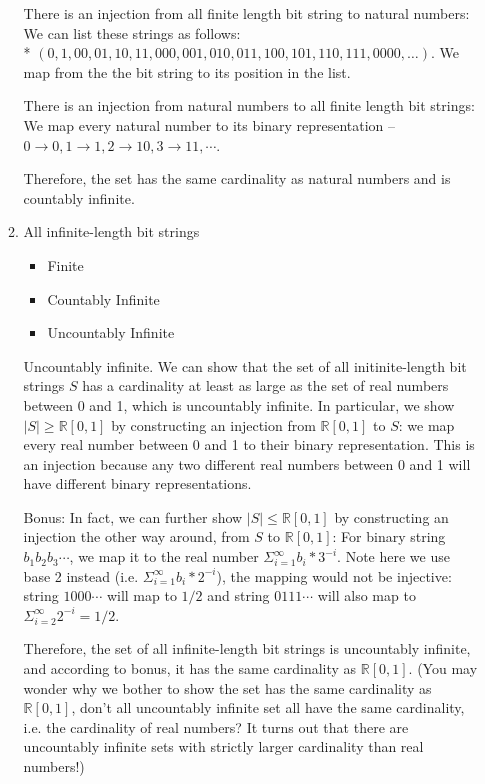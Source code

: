 \documentclass[11pt,preview]{standalone} %
\begin{document}
\begin{enumerate}
\begin{enumerate}
\begin{Choices}
		There is an injection from all finite length bit string to natural numbers: We can list these strings as follows: \\*
		$(0, 1, 00, 01, 10, 11, 000, 001, 010, 011, 100, 101, 110, 111, 0000, \ldots)$. 
		We map from the the bit string to its position in the list. 

		There is an injection from natural numbers to all finite length bit strings: We map every natural number to its binary representation -- $0 \rightarrow 0, 1 \rightarrow 1, 2 \rightarrow 10, 3 \rightarrow 11, \cdots$.

		Therefore, the set has the same cardinality as natural numbers and is countably infinite.
		\end{Choices}

		\item All infinite-length bit strings
		\begin{Choices}
		\begin{itemize}
			\FalseChoice\item Finite
			\FalseChoice\item Countably Infinite
			\TrueChoice\item Uncountably Infinite
		\end{itemize}
		\Solution Uncountably infinite. We can show that the set of all initinite-length bit strings $S$ has a cardinality at least as large as the set of real numbers between 0 and 1, which is uncountably infinite. In particular, we show $|S| \geq \mathbb{R}[0, 1]$ by constructing an injection from $\mathbb{R}[0, 1]$ to $S$: we map every real number between 0 and 1 to their binary representation. This is an injection because any two different real numbers between 0 and 1 will have different binary representations. 

		Bonus: In fact, we can further show $|S| \leq \mathbb{R}[0, 1]$ by constructing an injection the other way around, from $S$ to $\mathbb{R}[0, 1]$: For binary string $b_1b_2b_3 \cdots$, we map it to the real number 
		$\Sigma_{i=1} ^ {\infty} b_i * 3 ^ {-i}$. Note here we use base 2 instead (i.e. $\Sigma_{i=1} ^ {\infty} b_i  * 2 ^ {-i}$), the mapping would not be injective: string $1000 \cdots$ will map to $1/2$ and string $0111 \cdots$ will also map to $\Sigma_{i=2} ^ {\infty} 2 ^ {-i} = 1 / 2$.

		Therefore, the set of all infinite-length bit strings is uncountably infinite, and according to bonus, it has the same cardinality as $\mathbb{R}[0, 1]$. (You may wonder why we bother to show the set has the same cardinality as $\mathbb{R}[0, 1]$, don't all uncountably infinite set all have the same cardinality, i.e. the cardinality of real numbers? It turns out that there are uncountably infinite sets with strictly larger cardinality than real numbers!)
		\end{Choices}


\end{enumerate}
\end{enumerate}
\end{document}
